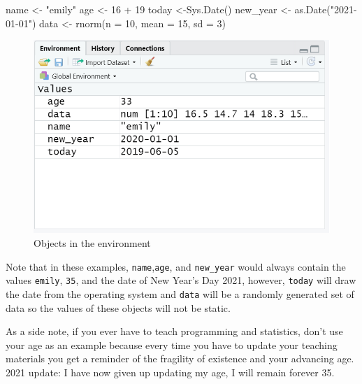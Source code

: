 \documentclass[
  oneside]{book}
\newenvironment{Shaded}{\begin{snugshade}}{\end{snugshade}}
\newcommand{\AttributeTok}[1]{\textcolor[rgb]{0.77,0.63,0.00}{#1}}
\newcommand{\DecValTok}[1]{\textcolor[rgb]{0.00,0.00,0.81}{#1}}
\newcommand{\FunctionTok}[1]{\textcolor[rgb]{0.00,0.00,0.00}{#1}}
\newcommand{\NormalTok}[1]{#1}
\newcommand{\OtherTok}[1]{\textcolor[rgb]{0.56,0.35,0.01}{#1}}
\newcommand{\SpecialCharTok}[1]{\textcolor[rgb]{0.00,0.00,0.00}{#1}}
\newcommand{\StringTok}[1]{\textcolor[rgb]{0.31,0.60,0.02}{#1}}
\begin{document}
\begin{Shaded}
\begin{Highlighting}[]
\NormalTok{name }\OtherTok{\textless{}{-}} \StringTok{"emily"}
\NormalTok{age }\OtherTok{\textless{}{-}} \DecValTok{16} \SpecialCharTok{+} \DecValTok{19} 
\NormalTok{today }\OtherTok{\textless{}{-}}\FunctionTok{Sys.Date}\NormalTok{()}
\NormalTok{new\_year }\OtherTok{\textless{}{-}} \FunctionTok{as.Date}\NormalTok{(}\StringTok{"2021{-}01{-}01"}\NormalTok{)}
\NormalTok{data }\OtherTok{\textless{}{-}} \FunctionTok{rnorm}\NormalTok{(}\AttributeTok{n =} \DecValTok{10}\NormalTok{, }\AttributeTok{mean =} \DecValTok{15}\NormalTok{, }\AttributeTok{sd =} \DecValTok{3}\NormalTok{)}
\end{Highlighting}
\end{Shaded}

\begin{figure}

{\centering \includegraphics[width=1\linewidth]{images/objects-enviro} 

}

\caption{Objects in the environment}\label{fig:img-objects-enviro}
\end{figure}

Note that in these examples, \texttt{name},\texttt{age}, and \texttt{new\_year} would always contain the values \texttt{emily}, \texttt{35}, and the date of New Year's Day 2021, however, \texttt{today} will draw the date from the operating system and \texttt{data} will be a randomly generated set of data so the values of these objects will not be static.

As a side note, if you ever have to teach programming and statistics, don't use your age as an example because every time you have to update your teaching materials you get a reminder of the fragility of existence and your advancing age. 2021 update: I have now given up updating my age, I will remain forever 35.
\end{document}
